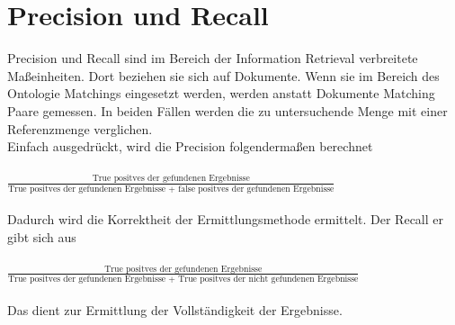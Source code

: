 	\section{Precision und Recall}
	Precision und Recall sind im Bereich der Information Retrieval verbreitete
	Maßeinheiten. Dort beziehen sie sich auf Dokumente.
	Wenn sie im Bereich des Ontologie Matchings eingesetzt werden, werden anstatt Dokumente Matching Paare
	gemessen. In beiden Fällen
	werden die zu untersuchende Menge mit einer Referenzmenge
	verglichen.\cite{Euz07}\\
	Einfach ausgedrückt, wird die Precision folgendermaßen
	berechnet\\\\
	\( \frac{\text{True positves der gefundenen Ergebnisse}}{\text{True
	positves der gefundenen Ergebnisse + false positves der gefundenen Ergebnisse}} \)
	\\\\
	Dadurch wird die Korrektheit der Ermittlungsmethode ermittelt\cite{Euz07}.
	Der Recall er gibt sich aus\\\\
	\( \frac{\text{True positves der gefundenen
	Ergebnisse}}{\text{True positves der gefundenen Ergebnisse + True positves der
	nicht gefundenen Ergebnisse}} \)
	\\\\
	Das dient zur Ermittlung der Vollständigkeit der Ergebnisse.\cite{Euz07}
	
	\cleardoublepage
	\pagebreak[4] 